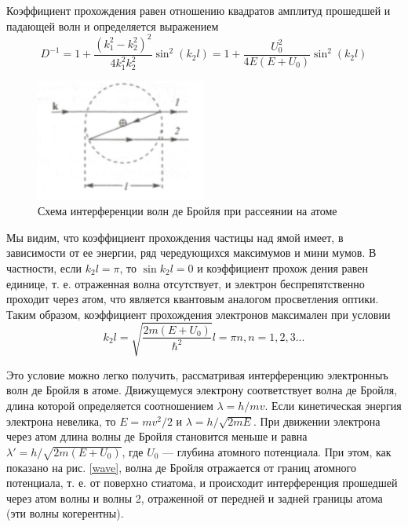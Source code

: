 \documentclass[14pt,a4paper]{scrartcl}
\begin{document}
Коэффициент прохождения равен отношению квадратов амплитуд прошедшей и падающей волн и определяется выражением
\begin{equation}
D^{-1} = 1 + \frac{(k_1^2 - k_2^2)^2}{4k_1^2 k_2^2} \sin^2(k_2l) = 1 + \frac{U_0^2}{4E(E+U_0)} \sin^2(k_2l)
\end{equation}



\begin{figure}[h]
\begin{center}
\includegraphics[width = 0.5\textwidth]{wave.png}
\caption{Схема интерференции волн де Бройля при рассеянии на атоме}
\end{center}
\end{figure}







Мы видим, что коэффициент прохождения частицы над ямой имеет, в зависимости от ее энергии, ряд чередующихся максимумов и мини мумов. В частности, если $k_2l = \pi$, то $\sin k_2l = 0$ и коэффициент прохож дения равен единице, т. е. отраженная волна отсутствует, и электрон беспрепятственно проходит через атом, что является квантовым аналогом просветления оптики.
Таким образом, коэффициент прохождения электронов максимален при условии 
\begin{equation}
k_2l = \sqrt{\frac{2m(E+U_0)}{\hbar^2}}l = \pi n, n = 1, 2, 3...
\end{equation}

Это условие можно легко получить, рассматривая интерференцию электронныъ волн де Бройля в атоме. Движущемуся электрону соответствует волна де Бройля, длина которой определяется соотношением $\lambda  = h/mv$. Если кинетическая энергия электрона невелика, то $E = mv^2/2$ и $\lambda = h/\sqrt{2mE}$. При движении электрона через атом длина волны де Бройля становится меньше и равна $\lambda' = h/\sqrt{2m(E + U_0)}$, где $U_0$ — глубина атомного потенциала. При этом, как показано на рис. \ref{wave}, волна де Бройля отражается от границ атомного потенциала, т. е. от поверхно стиатома, и происходит интерференция прошедшей через атом волны и волны 2, отраженной от передней и задней границы атома (эти волны когерентны).
\end{document}
